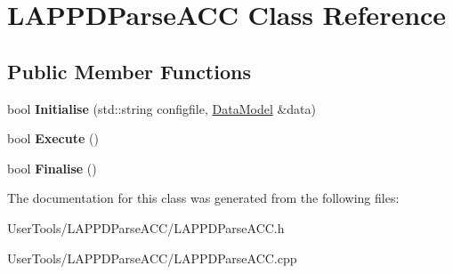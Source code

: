 \hypertarget{classLAPPDParseACC}{
\section{LAPPDParseACC Class Reference}
\label{classLAPPDParseACC}
}
\subsection*{Public Member Functions}
\begin{DoxyCompactItemize}
\item 
\hypertarget{classLAPPDParseACC_acb7a9ca57ebef424c67ee6b2452c865e}{
bool {\bfseries Initialise} (std::string configfile, \hyperlink{classDataModel}{DataModel} \&data)}
\label{classLAPPDParseACC_acb7a9ca57ebef424c67ee6b2452c865e}

\item 
\hypertarget{classLAPPDParseACC_a398f4910f5179cc7463302c52a7280fb}{
bool {\bfseries Execute} ()}
\label{classLAPPDParseACC_a398f4910f5179cc7463302c52a7280fb}

\item 
\hypertarget{classLAPPDParseACC_a27d71df3f3481f978a819ea1830367ae}{
bool {\bfseries Finalise} ()}
\label{classLAPPDParseACC_a27d71df3f3481f978a819ea1830367ae}

\end{DoxyCompactItemize}


The documentation for this class was generated from the following files:\begin{DoxyCompactItemize}
\item 
UserTools/LAPPDParseACC/LAPPDParseACC.h\item 
UserTools/LAPPDParseACC/LAPPDParseACC.cpp\end{DoxyCompactItemize}
